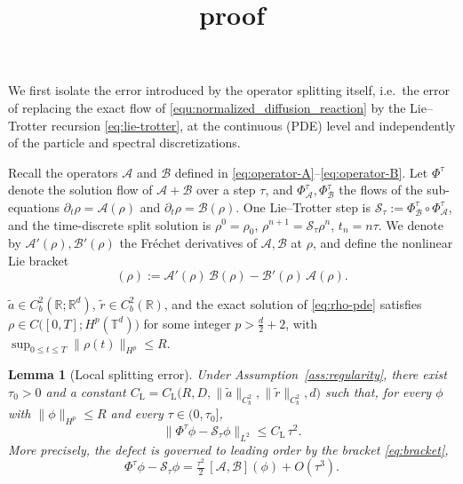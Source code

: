 \documentclass[12pt]{article}
\title{proof}
\newtheorem{lemma}[theorem]{Lemma}
\begin{document}
We first isolate the error introduced by the operator splitting itself, i.e.\ the error of replacing the exact flow of \eqref{equ:normalized_diffusion_reaction} by the Lie--Trotter recursion \eqref{eq:lie-trotter}, at the continuous
(PDE) level and independently of the particle and spectral discretizations.

Recall the operators $\mathcal A$ and $\mathcal B$ defined in
\eqref{eq:operator-A}--\eqref{eq:operator-B}. Let $\Phi^{\tau}$ denote
the solution flow of $\mathcal A+\mathcal B$ over a step $\tau$, and
$\Phi^{\tau}_{\mathcal A},\Phi^{\tau}_{\mathcal B}$ the flows of the
sub-equations $\partial_t\rho=\mathcal A(\rho)$ and
$\partial_t\rho=\mathcal B(\rho)$. One Lie--Trotter step is
$\mathcal S_{\tau}:=\Phi^{\tau}_{\mathcal B}\circ\Phi^{\tau}_{\mathcal A}$, and the
time-discrete split solution is $\rho^{0}=\rho_0$,
$\rho^{n+1}=\mathcal S_{\tau}\rho^{n}$, $t_n=n\tau$.
We denote by $\mathcal A'(\rho),\mathcal B'(\rho)$ the Fréchet derivatives of
$\mathcal A,\mathcal B$ at $\rho$, and define the nonlinear Lie bracket
\begin{equation}
[\mathcal A,\mathcal B](\rho)
:=\mathcal A'(\rho)\,\mathcal B(\rho)-\mathcal B'(\rho)\,\mathcal A(\rho).
\label{eq:bracket}
\end{equation}


\begin{assumption}\label{ass:regularity}
   $\tilde a\in C^{2}_{b}(\mathbb R;\mathbb R^{d})$,
$\tilde r\in C^{2}_{b}(\mathbb R)$, and the exact solution of
\eqref{eq:rho-pde} satisfies
$\rho\in C\big([0,T];H^{p}(\mathbb T^{d})\big)$ for some integer
$p>\tfrac d2+2$, with
$\sup_{0\le t\le T}\|\rho(t)\|_{H^{p}}\le R$.
\end{assumption}

\begin{lemma}[Local splitting error]\label{lem:local-split}
Under Assumption~\ref{ass:regularity}, there exist $\tau_0>0$ and a constant
$C_{\mathrm L}=C_{\mathrm L}\big(R,D,\|\tilde a\|_{C^{2}_b},\|\tilde r\|_{C^{2}_b},d\big)$
such that, for every $\phi$ with $\|\phi\|_{H^{p}}\le R$ and every
$\tau\in(0,\tau_0]$,
\[
\big\|\Phi^{\tau}\phi-\mathcal S_{\tau}\phi\big\|_{L^{2}}\le C_{\mathrm L}\,\tau^{2}.
\]
More precisely, the defect is governed to leading order by the bracket
\eqref{eq:bracket},
\begin{equation}
\Phi^{\tau}\phi-\mathcal S_{\tau}\phi
=\tfrac{\tau^{2}}{2}\,[\mathcal A,\mathcal B](\phi)+O(\tau^{3}).
\label{eq:leading}
\end{equation}
\end{lemma}
\end{document}
